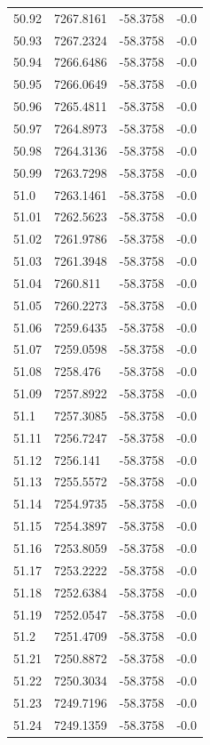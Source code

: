 \begin{table}[H]
\begin{tabular}{llll}
50.92 & 7267.8161 & -58.3758 & -0.0 \\
50.93 & 7267.2324 & -58.3758 & -0.0 \\
50.94 & 7266.6486 & -58.3758 & -0.0 \\
50.95 & 7266.0649 & -58.3758 & -0.0 \\
50.96 & 7265.4811 & -58.3758 & -0.0 \\
50.97 & 7264.8973 & -58.3758 & -0.0 \\
50.98 & 7264.3136 & -58.3758 & -0.0 \\
50.99 & 7263.7298 & -58.3758 & -0.0 \\
51.0 & 7263.1461 & -58.3758 & -0.0 \\
51.01 & 7262.5623 & -58.3758 & -0.0 \\
51.02 & 7261.9786 & -58.3758 & -0.0 \\
51.03 & 7261.3948 & -58.3758 & -0.0 \\
51.04 & 7260.811 & -58.3758 & -0.0 \\
51.05 & 7260.2273 & -58.3758 & -0.0 \\
51.06 & 7259.6435 & -58.3758 & -0.0 \\
51.07 & 7259.0598 & -58.3758 & -0.0 \\
51.08 & 7258.476 & -58.3758 & -0.0 \\
51.09 & 7257.8922 & -58.3758 & -0.0 \\
51.1 & 7257.3085 & -58.3758 & -0.0 \\
51.11 & 7256.7247 & -58.3758 & -0.0 \\
51.12 & 7256.141 & -58.3758 & -0.0 \\
51.13 & 7255.5572 & -58.3758 & -0.0 \\
51.14 & 7254.9735 & -58.3758 & -0.0 \\
51.15 & 7254.3897 & -58.3758 & -0.0 \\
51.16 & 7253.8059 & -58.3758 & -0.0 \\
51.17 & 7253.2222 & -58.3758 & -0.0 \\
51.18 & 7252.6384 & -58.3758 & -0.0 \\
51.19 & 7252.0547 & -58.3758 & -0.0 \\
51.2 & 7251.4709 & -58.3758 & -0.0 \\
51.21 & 7250.8872 & -58.3758 & -0.0 \\
51.22 & 7250.3034 & -58.3758 & -0.0 \\
51.23 & 7249.7196 & -58.3758 & -0.0 \\
51.24 & 7249.1359 & -58.3758 & -0.0 \\

\end{tabular}
\end{table}
